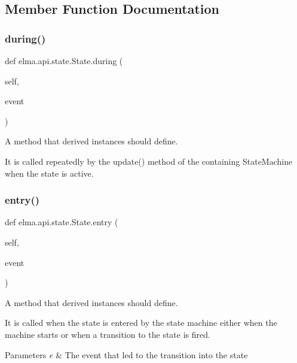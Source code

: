 \subsection{Member Function Documentation}
\mbox{\label{classelma_1_1api_1_1state_1_1State_a67235fad4e69aa8c21ec26eae249e01d}} 
\subsubsection{\texorpdfstring{during()}{during()}}
{\footnotesize\ttfamily def elma.\+api.\+state.\+State.\+during (\begin{DoxyParamCaption}\item[{}]{self,  }\item[{}]{event }\end{DoxyParamCaption})}



A method that derived instances should define. 

It is called repeatedly by the update() method of the containing State\+Machine when the state is active. \mbox{\label{classelma_1_1api_1_1state_1_1State_a9faa0f15ba6f380e9815554cdbfd586d}} 
\subsubsection{\texorpdfstring{entry()}{entry()}}
{\footnotesize\ttfamily def elma.\+api.\+state.\+State.\+entry (\begin{DoxyParamCaption}\item[{}]{self,  }\item[{}]{event }\end{DoxyParamCaption})}



A method that derived instances should define. 

It is called when the state is entered by the state machine either when the machine starts or when a transition to the state is fired. 
\begin{DoxyParams}{Parameters}
{\em e} & The event that led to the transition into the state \\
\hline
\end{DoxyParams}
\mbox{\label{classelma_1_1api_1_1state_1_1State_ad57604af6fe62f311bc073cf027ea552}} 
